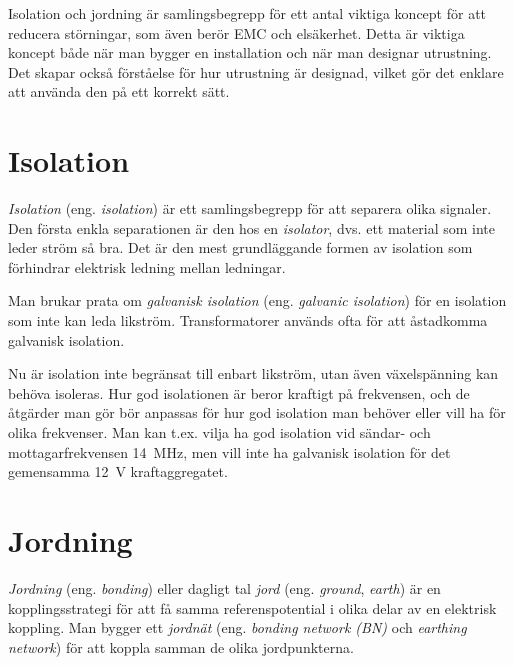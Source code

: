 
Isolation och jordning är samlingsbegrepp för ett antal viktiga koncept för
att reducera störningar, som även berör EMC och elsäkerhet.
Detta är viktiga koncept både när man bygger en installation och när man
designar utrustning.
Det skapar också förståelse för hur utrustning är designad, vilket gör det
enklare att använda den på ett korrekt sätt.

\section{Isolation}

\emph{Isolation} (eng. \emph{isolation}) är ett samlingsbegrepp för att separera
olika signaler.
Den första enkla separationen är den hos en \emph{isolator}, dvs. ett material
som inte leder ström så bra.
Det är den mest grundläggande formen av isolation som förhindrar elektrisk
ledning mellan ledningar.

Man brukar prata om \emph{galvanisk isolation} (eng. \emph{galvanic isolation})
för en isolation som inte kan leda likström.
Transformatorer används ofta för att åstadkomma galvanisk isolation.

Nu är isolation inte begränsat till enbart likström, utan även växelspänning
kan behöva isoleras.
Hur god isolationen är beror kraftigt på frekvensen, och de åtgärder man gör
bör anpassas för hur god isolation man behöver eller vill ha för olika
frekvenser.
Man kan t.ex. vilja ha god isolation vid sändar- och mottagarfrekvensen 14~MHz,
men vill inte ha galvanisk isolation för det gemensamma 12~V kraftaggregatet.

\section{Jordning}

\emph{Jordning} (eng. \emph{bonding}) eller dagligt tal \emph{jord} (eng.
\emph{ground}, \emph{earth}) är en kopplingsstrategi för att få samma
referenspotential i olika delar av en elektrisk koppling.
Man bygger ett \emph{jordnät} (eng. \emph{bonding network (BN)}
\cite[kap 3.2.1]{K27-1991} och \emph{earthing network})
\cite[kap 3.1.3]{K27-1991} för att koppla samman de olika jordpunkterna.

